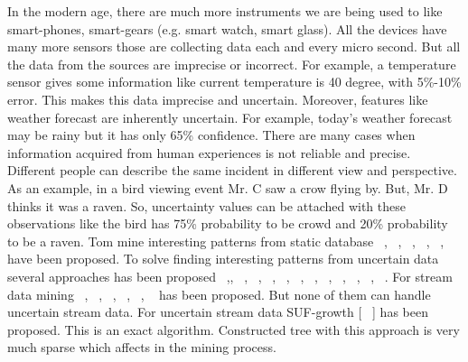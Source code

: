 \documentclass[conference]{IEEEtran}
\begin{document}
In the modern age, there are much more instruments we are being used to like smart-phones, smart-gears (e.g. smart watch, smart glass). All the devices have many more sensors those are collecting data each and every micro second. But all the data from the sources are imprecise or incorrect. For example, a temperature sensor gives some information like current temperature is 40 degree, with 5\%-10\% error. This makes this data imprecise and uncertain. Moreover, features like weather forecast are inherently uncertain. For example, today's weather forecast may be rainy but it has only 65\% confidence. There are many cases when information acquired from human experiences is not reliable and precise. Different people can describe the same incident in different view and perspective. As an example, in a bird viewing event Mr. C saw a crow flying by. But, Mr. D thinks it was a raven. So, uncertainty values can be attached with these observations like the bird has 75\% probability to be crowd and 20\% probability to be a raven.
Tom mine interesting patterns from static database ~\cite{apriori}, ~\cite{fp_growth}, ~\cite{close_1}, ~\cite{closet}, ~\cite{closet_plus}, ~\cite{close_2} have been proposed. To solve finding interesting patterns from uncertain data several approaches has been proposed ~\cite{u_priori},, ~\cite{uf_growth}, ~\cite{ufp_growth}, ~\cite{uh_mining}, ~\cite{puf_growth}, ~\cite{cuf_growth}, ~\cite{uncertain_01}, ~\cite{uncertain_02}, ~\cite{uncertain_03}, ~\cite{uncertain_04}, ~\cite{uncertain_05}, ~\cite{uncertain_06}. For stream data mining ~\cite{ds_tree}, ~\cite{stream_01}, ~\cite{stream_02}, ~\cite{stream_03}, ~\cite{stream_04}, ~\cite{stream_05} has been proposed. But none of them can handle uncertain stream data. For uncertain stream data SUF-growth [~\cite{suf_growth} ] has been proposed. This is an exact algorithm. Constructed tree with this approach is very much sparse which affects in the mining process. 
\end{document}
